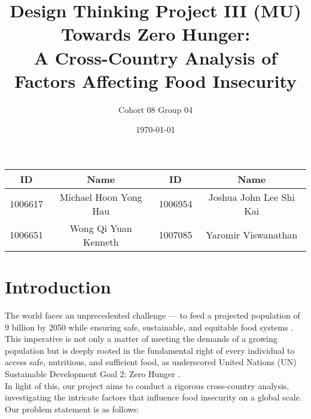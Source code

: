 \documentclass{article}
\title{\Bigg01.020 Design Thinking Project III (MU) \\ Towards Zero Hunger: \\ A Cross-Country Analysis of Factors Affecting Food Insecurity}
\author{Cohort 08 Group 04}
\date{\today}
\begin{document}
\maketitle
\thispagestyle{empty}

\begin{center}
\begin{tabular}{ |c|c|c|c| } 
 \hline
  ID & Name & ID & Name \\
 \hline
  1006617 & Michael Hoon Yong Hau & 1006954 & Joshua John Lee Shi Kai \\
 \hline
  1006651 & Wong Qi Yuan Kenneth & 1007085 & Yaromir Viswanathan \\
 \hline
\end{tabular}
\end{center} 



\tableofcontents

\newpage
\setcounter{page}{1}

\section{Introduction} 
The world faces an unprecedented challenge — to feed a projected population of 9 billion by 2050 while ensuring safe, sustainable, and equitable food systems \cite{doi:10.1126/science.1185383}. This imperative is not only a matter of meeting the demands of a growing population but is deeply rooted in the fundamental right of every individual to access safe, nutritious, and sufficient food, as underscored United Nations (UN) Sustainable Development Goal 2: Zero Hunger \cite{unsdg2}. \\

\noindent In light of this, our project aims to conduct a rigorous cross-country analysis, investigating the intricate factors that influence food insecurity on a global scale. Our problem statement is as follows: 
\end{document}
